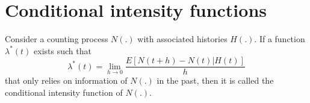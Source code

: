 \section{Conditional intensity functions}
\begin{Definition}{}	
Consider a counting process $N(.)$ with associated histories $H(.)$. If a function $\lambda^{*}(t)$ exists such that
 $$\lambda^{*}(t)= \lim_{h \to 0} \dfrac{E[N(t + h)-N(t) |H(t)]}{h}$$
that only relies on information of $N(.)$ in the past, then it is called the
conditional intensity function of $N(.)$.
\end{Definition}



